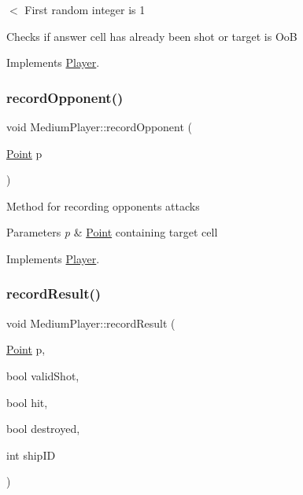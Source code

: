 $<$ First random integer is 1

Checks if answer cell has already been shot or target is OoB 

Implements \mbox{\hyperlink{class_player_a2cc7a83d11158eafd8d49d4b9f23ce56}{Player}}.

\mbox{\label{class_medium_player_a6183d4a8fe3d68419afcfa9e33cd5928}} 
\subsubsection{\texorpdfstring{record\+Opponent()}{recordOpponent()}}
{\footnotesize\ttfamily void Medium\+Player\+::record\+Opponent (\begin{DoxyParamCaption}\item[{\mbox{\hyperlink{class_point}{Point}}}]{p }\end{DoxyParamCaption})\hspace{0.3cm}{\ttfamily [virtual]}}

Method for recording opponent\textquotesingle{}s attacks 
\begin{DoxyParams}{Parameters}
{\em p} & \mbox{\hyperlink{class_point}{Point}} containing target cell \\
\hline
\end{DoxyParams}


Implements \mbox{\hyperlink{class_player_a768e14edee61e208e6fd295cdd72a49c}{Player}}.

\mbox{\label{class_medium_player_aeadd8498cba5c447afbb5a0eb7408285}} 
\subsubsection{\texorpdfstring{record\+Result()}{recordResult()}}
{\footnotesize\ttfamily void Medium\+Player\+::record\+Result (\begin{DoxyParamCaption}\item[{\mbox{\hyperlink{class_point}{Point}}}]{p,  }\item[{bool}]{valid\+Shot,  }\item[{bool}]{hit,  }\item[{bool}]{destroyed,  }\item[{int}]{ship\+ID }\end{DoxyParamCaption})\hspace{0.3cm}{\ttfamily [virtual]}}

